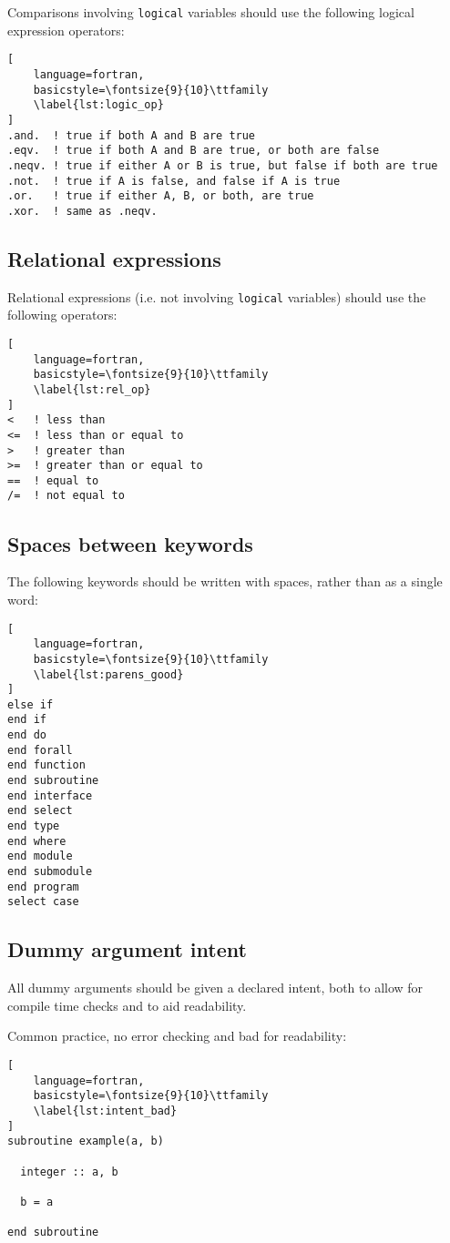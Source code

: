 \documentclass[11pt]{article}
\begin{document}
Comparisons involving \texttt{logical} variables should use the 
following logical expression operators:
\begin{lstlisting}[
	language=fortran,
    basicstyle=\fontsize{9}{10}\ttfamily
    \label{lst:logic_op}
]
.and.  ! true if both A and B are true 
.eqv.  ! true if both A and B are true, or both are false
.neqv. ! true if either A or B is true, but false if both are true
.not.  ! true if A is false, and false if A is true
.or.   ! true if either A, B, or both, are true
.xor.  ! same as .neqv. 
\end{lstlisting}

\subsection{Relational expressions}
Relational expressions (i.e. not involving \texttt{logical} variables) should use the following operators:
\begin{lstlisting}[
	language=fortran,
    basicstyle=\fontsize{9}{10}\ttfamily
    \label{lst:rel_op}
]
<   ! less than
<=  ! less than or equal to
>   ! greater than
>=  ! greater than or equal to
==  ! equal to
/=  ! not equal to
\end{lstlisting}

\subsection{Spaces between keywords}
The following keywords should be written with spaces, rather than as a single word:
\begin{lstlisting}[
	language=fortran,
    basicstyle=\fontsize{9}{10}\ttfamily
    \label{lst:parens_good}
]
else if
end if
end do
end forall
end function
end subroutine
end interface
end select
end type
end where
end module
end submodule
end program
select case
\end{lstlisting}

\subsection{Dummy argument intent}
All dummy arguments should be given a declared intent, both to allow for compile time checks and to aid readability.

Common practice, no error checking and bad for readability:
\begin{lstlisting}[
	language=fortran,
    basicstyle=\fontsize{9}{10}\ttfamily
    \label{lst:intent_bad}
]
subroutine example(a, b)

  integer :: a, b

  b = a

end subroutine
\end{lstlisting}
\end{document}
